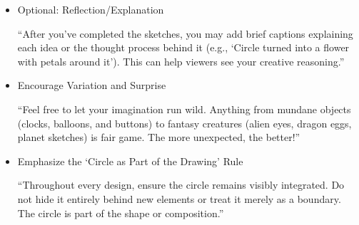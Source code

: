 \begin{itemize}
\item Optional: Reflection/Explanation

“After you’ve completed the sketches, you may add brief captions explaining each idea or the thought process behind it (e.g., ‘Circle turned into a flower with petals around it’). This can help viewers see your creative reasoning.”

\item Encourage Variation and Surprise

“Feel free to let your imagination run wild. Anything from mundane objects (clocks, balloons, and buttons) to fantasy creatures (alien eyes, dragon eggs, planet sketches) is fair game. The more unexpected, the better!”

\item Emphasize the ‘Circle as Part of the Drawing’ Rule

“Throughout every design, ensure the circle remains visibly integrated. Do not hide it entirely behind new elements or treat it merely as a boundary. The circle is part of the shape or composition.”

\end{itemize}

